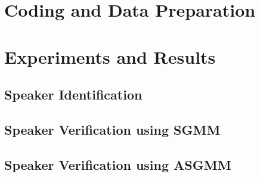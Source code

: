 \section{Coding and Data Preparation}
\label{sec:coding-and-data-preparation}

\section{Experiments and Results}
\label{sec:experiments-and-results}

\subsection{Speaker Identification}

\subsection{Speaker Verification using SGMM}

\subsection{Speaker Verification using ASGMM}
